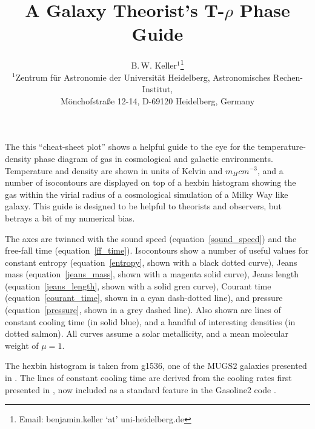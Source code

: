 \documentclass[twocolumn]{article}
\begin{document}
\title{\vspace{-1cm}A Galaxy Theorist's T-$\rho$ Phase Guide}
\author{B.\,W. Keller$^1$\thanks{Email: benjamin.keller `at'
uni-heidelberg.de}
\vspace*{6pt}\\
$^1$Zentrum f{\"u}r Astronomie der Universit\"at Heidelberg, Astronomisches
Rechen-Institut,  \\ M{\"o}nchofstra{\ss}e 12-14, D-69120 Heidelberg, Germany\\
}
\maketitle
The this ``cheat-sheet plot'' shows a helpful guide to the eye for the
temperature-density phase diagram of gas in cosmological and galactic
environments.  Temperature and density are shown in units of Kelvin and $m_H
cm^{-3}$, and a number of isocontours are displayed on top of a hexbin histogram
showing the gas within the virial radius of a cosmological simulation of a Milky
Way like galaxy.  This guide is designed to be helpful to theorists and
observers, but betrays a bit of my numerical bias.

The axes are twinned with the sound speed (equation~\ref{sound_speed}) and the
free-fall time (equation~\ref{ff_time}).  Isocontours show a number of useful
values for constant entropy (equation~\ref{entropy}, shown with a black dotted
curve), Jeans mass (equation~\ref{jeans_mass}, shown with a magenta solid
curve), Jeans length (equation~\ref{jeans_length}, shown with a solid gren
curve), Courant time (equation~\ref{courant_time}, shown in a cyan dash-dotted
line), and pressure (equation~\ref{pressure}, shown in a grey dashed line).
Also shown are lines of constant cooling time (in solid blue), and a handful of
interesting densities (in dotted salmon).  All curves assume a solar
metallicity, and a mean molecular weight of $\mu=1$.

The hexbin histogram is taken from g1536, one of the MUGS2 galaxies presented
in \citet{Keller2015,Keller2016}.  The lines of constant cooling time are
derived from the cooling rates first presented in \citet{Shen2010}, now included
as a standard feature in the {\sc Gasoline2} code \citep{Wadsley2017}.
\end{document}
